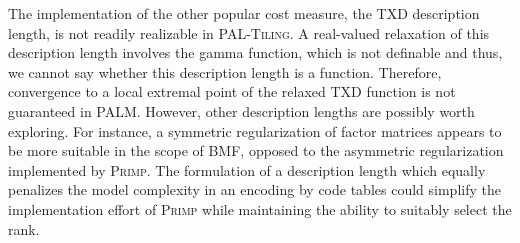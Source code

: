 The implementation of the other popular cost measure, the TXD description length, is not readily realizable in \textsc{PAL-Tiling}. A real-valued relaxation of this description length involves the gamma function, which is not definable and thus, we cannot say whether this description length is a \KL function. Therefore, convergence to a local extremal point of the relaxed TXD function is not guaranteed in PALM. However, other description lengths are possibly worth exploring. For instance, a symmetric regularization of factor matrices appears to be more suitable in the scope of BMF, opposed to the asymmetric regularization implemented by \textsc{Primp}. The formulation of a description length which equally penalizes the model complexity in an encoding by code tables could simplify the implementation effort of \textsc{Primp} while maintaining the ability to suitably select the rank.
